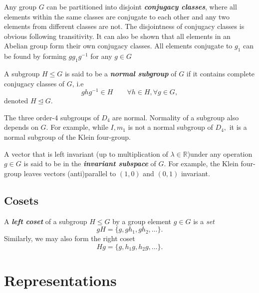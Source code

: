 \documentclass{article}
\begin{document}
Any group $G$ can be partitioned into disjoint \textit{\textbf{conjugacy classes}}, where all elements within the same classes are conjugate to each other and any two elements from different classes are not. The disjointness of conjugacy classes is obvious following transitivity. It can also be shown that all elements in an Abelian group form their own conjugacy classes. All elements conjugate to $g_1$ can be found by forming $g g_1 g^{-1}$ for any $g \in G$

A subgroup $H \leq G$ is said to be a \textit{\textbf{normal subgroup}} of $G$ if it contains complete conjugacy classes of $G$, i.e
\[
    g h g^{-1} \in H \qquad \forall h \in H, \forall g \in G,   
\]
denoted $H \unlhd G.$

The three order-4 subgroups of $D_4$ are normal. Normality of a subgroup also depends on $G.$ For example, while ${I, m_1}$ is not a normal subgroup of $D_4,$ it is a normal subgroup of the Klein four-group. 

A vector that is left invariant (up to multiplication of $\lambda \in \mathbb{R}$)under any operation $g \in G$ is said to be in the \textit{\textbf{invariant subspace}} of $G.$ For example, the Klein four-group leaves vectors (anti)parallel
to $(1,0)$ and $(0,1)$ invariant. 
\subsection{Cosets}
A \textit{\textbf{left coset}} of a subgroup $H \leq  G$ by a group element $g \in G$ is a \textit{set}
\[
    gH = \{ g, gh_1, gh_2, \ldots  \}. 
\]
Similarly, we may also form the right coset
\[
    Hg = \{ g, h_1 g, h_2 g, \ldots  \}.
\]
\section{Representations}
\end{document}
